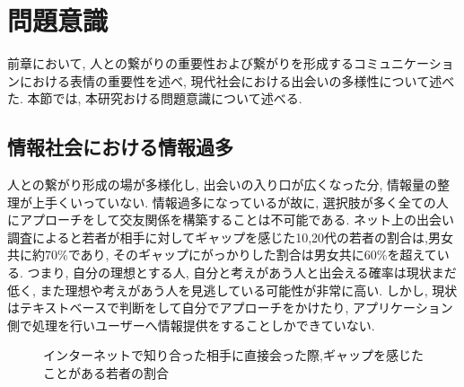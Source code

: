 


\section{問題意識}
前章において, 人との繋がりの重要性および繋がりを形成するコミュニケーションにおける表情の重要性を述べ, 現代社会における出会いの多様性について述べた.
本節では, 本研究おける問題意識について述べる.

\subsection{情報社会における情報過多}
人との繋がり形成の場が多様化し, 出会いの入り口が広くなった分, 情報量の整理が上手くいっていない.
情報過多になっているが故に, 選択肢が多く全ての人にアプローチをして交友関係を構築することは不可能である.
ネット上の出会い調査によると若者が相手に対してギャップを感じた10,20代の若者の割合は,男女共に約70\%であり,
そのギャップにがっかりした割合は男女共に60\%を超えている\cite{mandom}.
つまり, 自分の理想とする人, 自分と考えがあう人と出会える確率は現状まだ低く,
また理想や考えがあう人を見逃している可能性が非常に高い.
しかし, 現状はテキストベースで判断をして自分でアプローチをかけたり,
アプリケーション側で処理を行いユーザーへ情報提供をすることしかできていない.

\begin{figure}[htbp]
    \begin{center}
    \end{center}
    \caption{インターネットで知り合った相手に直接会った際,ギャップを感じたことがある若者の割合}
    \label{fig:onlinemeeting_to_real}
\end{figure}

